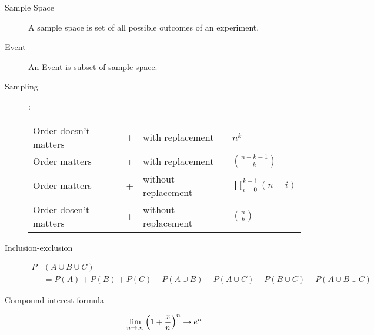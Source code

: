 \begin{slide}[Basics]
\begin{description}
	\item[Sample Space] A sample space is set of all possible outcomes of an experiment. 
	\item[Event] An Event is subset of sample space.
	\item[Sampling]:\newline
		\begin{tabular}{lcll}
			Order doesn't matters& + &with replacement& $n^k$\\
			Order matters& + &with replacement& ${n+k-1\choose k}$\\
			Order matters& + &without replacement& $ \prod\limits_{i=0}^{k-1}(n-i)$\\
			Order dosen't matters& + &without replacement& ${n\choose k}$
		\end{tabular}
\end{description}
\end{slide}


\begin{slide}
\begin{description}
\item[Inclusion-exclusion]
\begin{align*}
  P&(A\cup B\cup C)\\ &=  P(A) + P(B) + P(C) - P(A\cup B) - P(A\cup C) - P(B\cup C)+ P(A\cup B\cup C)  
\end{align*}

\item[Compound interest formula]$$\lim_{n\to\infty}\left(1+{x\over n}\right)^n  \to e^n$$
\end{description}
\end{slide}

